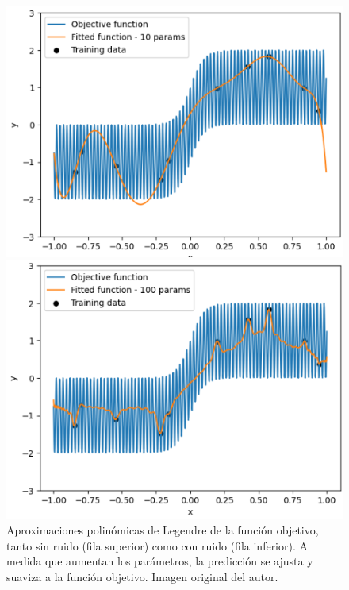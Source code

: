 \begin{figure}[h]
\begin{minipage}{0.32\textwidth}
        \centering
        \includegraphics[width=\linewidth]{img/experiments/hiperbolica_noise1.2.png}
    \end{minipage}
    \begin{minipage}{0.32\textwidth}
        \centering
        \includegraphics[width=\linewidth]{img/experiments/hiperbolica_noise1.3.png}
    \end{minipage}
    \caption[Aproximaciones polinómicas de Legendre de la función objetivo, tanto sin ruido como con ruido.]{Aproximaciones polinómicas de Legendre de la función objetivo, tanto sin ruido (fila superior) como con ruido (fila inferior). A medida que aumentan los parámetros, la predicción se ajusta y suaviza a la función objetivo. Imagen original del autor.}\label{fig:approx-hiperbolicas}
\end{figure}

